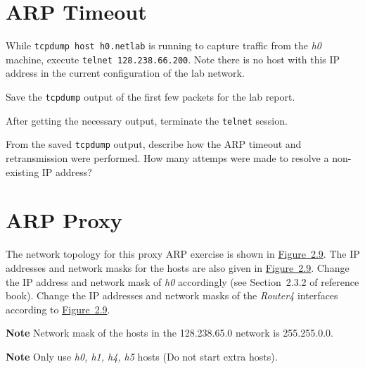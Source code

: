 \documentclass{../UTNetLab}
\begin{document}
\section{ARP Timeout}
    While \lstinline[emph={h0,netlab}]{tcpdump host h0.netlab} is running to capture traffic from the \textit{h0} machine, execute \lstinline{telnet 128.238.66.200}.
    Note there is no host with this IP address in the current configuration of the lab network.

    Save the \lstinline{tcpdump} output of the first few packets for the lab report.

    After getting the necessary output, terminate the \lstinline{telnet} session.

    \begin{report}
        \item From the saved \lstinline{tcpdump} output, describe how the ARP timeout and retransmission were performed.
            How many attemps were made to resolve a non-existing IP address?
    \end{report}

\section{ARP Proxy}
    The network topology for this proxy ARP exercise is shown in \hyperref[fig:2.9]{Figure~2.9}.
    The IP addresses and network masks for the hosts are also given in \hyperref[fig:2.9]{Figure~2.9}.
    Change the IP address and network mask of \textit{h0} accordingly (see Section~2.3.2 of reference book).
    Change the IP addresses and network masks of the \textit{Router4} interfaces according to \hyperref[fig:2.9]{Figure~2.9}.

    \textbf{Note}\quad
    Network mask of the hosts in the 128.238.65.0 network is 255.255.0.0.
    
    \textbf{Note}\quad
    Only use \textit{h0, h1, h4, h5} hosts (Do not start extra hosts).
\end{document}
